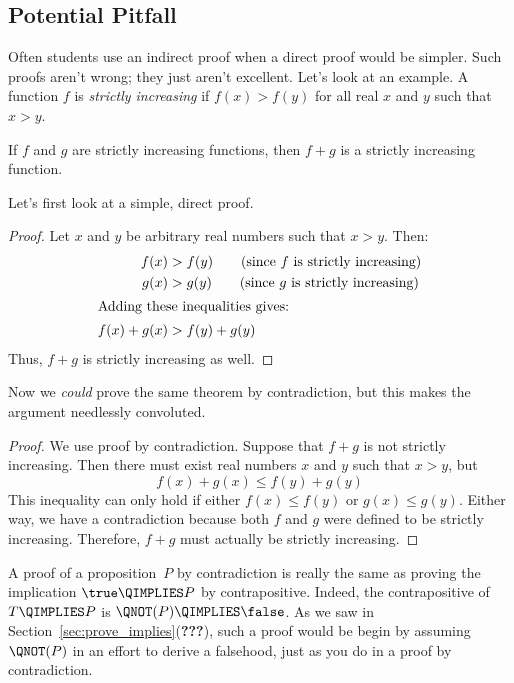 \begin{editingnotes}

\subsection{Potential Pitfall}

Often students use an indirect proof when a direct proof would be
simpler.  Such proofs aren't wrong; they just aren't excellent.  Let's
look at an example.  A function $f$ is \textit{strictly increasing} if
$f(x) > f(y)$ for all real $x$ and $y$ such that $x > y$.

\begin{theorem}
If $f$ and $g$ are strictly increasing functions, then $f + g$ is a
strictly increasing function.
\end{theorem}

Let's first look at a simple, direct proof.

\begin{proof}
Let $x$ and $y$ be arbitrary real numbers such that $x > y$.  Then:
%
\begin{align*}
f(x) & > f(y) \qquad \text{(since $f$ is strictly increasing)} \\
g(x) & > g(y) \qquad \text{(since $g$ is strictly increasing)} \\
\intertext{Adding these inequalities gives:}
f(x) + g(x) & > f(y) + g(y)
\end{align*}
%
Thus, $f + g$ is strictly increasing as well.
\end{proof}

Now we \textit{could} prove the same theorem by contradiction, but
this makes the argument needlessly convoluted.

\begin{proof}
We use proof by contradiction.  Suppose that $f + g$ is not strictly
increasing.  Then there must exist real numbers $x$ and $y$ such that
$x > y$, but
%
\[
f(x) + g(x) \leq f(y) + g(y)
\]
%
This inequality can only hold if either $f(x) \leq f(y)$ or $g(x) \leq
g(y)$.  Either way, we have a contradiction because both $f$ and $g$
were defined to be strictly increasing.  Therefore, $f + g$ must
actually be strictly increasing.
\end{proof}

\end{editingnotes}

A proof of a proposition~$P$ by contradiction is really the same as
proving the implication $\true \QIMPLIES P$ by contrapositive.
Indeed, the contrapositive of $T \QIMPLIES P$ is $\QNOT(P) \QIMPLIES
\false$.  As we saw in Section~\ref{sec:prove_implies}(\textbf{???}),
such a proof would be begin by assuming $\QNOT(P)$ in an effort to
derive a falsehood, just as you do in a proof by contradiction.

